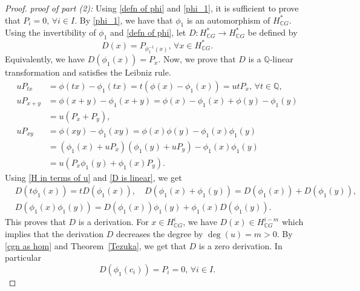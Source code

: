 \documentclass{amsart}
\newcommand{\thmref}[1]{Theorem~\ref{#1}}
\begin{document}
\begin{proof}
		
		\textit{proof of part (2):} Using \eqref{defn of phi} and \eqref{phi_1}, it is sufficient to prove that $P_i =0, \, \forall i \in I$. By \eqref{phi_1}, we have that $\phi_1$ is an automorphism of $H^*_{\mathbb CG}$. Using the invertibility of $\phi_1$ and \eqref{defn of phi}, let $D: H^*_{\mathbb{C}G} \rightarrow H^*_{\mathbb{C}G}$ be defined by $$D(x) = P_{\phi_1^{-1}(x)},\, \forall x \in H^*_{\mathbb{C}G}.$$
		Equivalently, we have $D(\phi_1(x)) = P_x$. Now, we prove that $D$ is a $\mathbb Q$-linear transformation and satisfies the Leibniz rule.
		\begin{equation}\label{D is linear}
			\begin{split}
				uP_{tx} &= \phi(tx) - \phi_1(tx) = t(\phi(x) - \phi_1(x)) = utP_{x},\, \forall t \in \mathbb{Q},\\
				uP_{x + y} &= \phi(x+y) - \phi_1(x+y) = \phi(x) - \phi_1(x)+ \phi(y) - \phi_1(y)\\ &= u(P_{x}+P_{y}),\\
				uP_{x y} &= \phi(x y) - \phi_1(xy) = \phi(x)\phi(y)-\phi_1(x)\phi_1(y) \\
				&= (\phi_1(x)+uP_{x})(\phi_1(y)+uP_y)- \phi_1(x)\phi_1(y)\\
				&= u(P_x\phi_1(y)+\phi_1(x)P_y).
			\end{split}
		\end{equation}
		Using \eqref{H in terms of u} and \eqref{D is linear}, we get  \begin{align*}
			& D(t\phi_1(x)) = tD(\phi_1(x)),\quad D(\phi_1(x)+\phi_1(y)) = D(\phi_1(x))+D(\phi_1(y)),\\
			&D(\phi_1(x)\phi_1(y)) = D(\phi_1(x))\phi_1(y)+\phi_1(x)D(\phi_1(y)).
		\end{align*}
		This proves that $D$ is a derivation. For $x \in H^i_{\mathbb{C}G}$, we have $D(x) \in H^{i-m}_{\mathbb{C}G}$ which implies that the derivation $D$ decreases the degree by $\deg(u)=m>0$. By \eqref{cgn as hom} and \thmref{Tezuka}, we get that $D$ is a zero derivation. In particular $$D(\phi_1(c_i))=P_i=0, \, \forall i \in I.$$
		

\end{proof}
\end{document}
